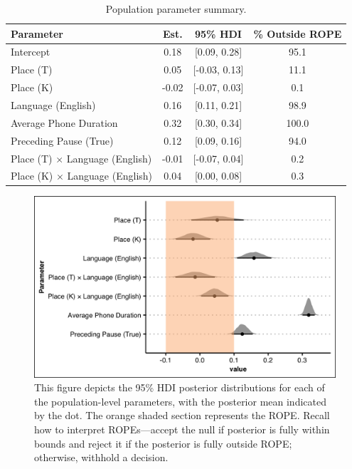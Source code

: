 \begin{table}[htbp]
  \caption{Population parameter summary.}
    \label{ch4:tab:poppar}
    \centering 
    \footnotesize
    \begin{tabular}{lccc}
    \toprule
    \textbf{Parameter}         & \textbf{Est.} &  \textbf{95\% HDI} & \textbf{\% Outside ROPE} \\
    \midrule
    Intercept                             &  0.18   & [0.09, 0.28]  & 95.1 \\
    Place (T)                             &  0.05   & [-0.03, 0.13] & 11.1 \\
    Place (K)                             & -0.02   & [-0.07, 0.03] & 0.1  \\
    Language (English)                    &  0.16   & [0.11, 0.21]  & 98.9 \\
    Average Phone Duration                &  0.32   & [0.30, 0.34]  & 100.0 \\
    Preceding Pause (True)                &  0.12   & [0.09, 0.16]  & 94.0 \\
    Place (T) $\times$ Language (English) & -0.01   & [-0.07, 0.04] & 0.2 \\
    Place (K) $\times$ Language (English) &  0.04   & [0.00, 0.08]  & 0.3 \\
    \bottomrule
    \end{tabular}
\end{table}

\begin{figure}[htbp]
  \begin{center}
  \includegraphics[width=\linewidth]{figures/ch4_poppar_5in.png} 
  \caption{This figure depicts the 95\% HDI posterior distributions for each of the population-level parameters, with the posterior mean indicated by the dot. The orange shaded section represents the ROPE. Recall how to interpret ROPEs---accept the null if posterior is fully within bounds and reject it if the posterior is fully outside ROPE; otherwise, withhold a decision.}
  \label{ch4:fig:poppar}
  \end{center}
\end{figure} 

